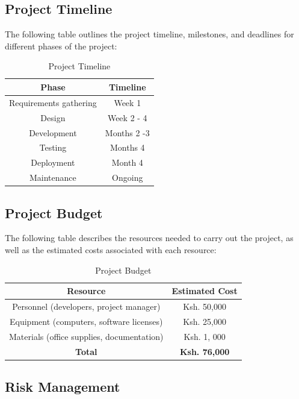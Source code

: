 \documentclass{article}
\begin{document}
\subsection{Project Timeline}

The following table outlines the project timeline, milestones, and deadlines for different phases of the project:

\begin{table}[htbp]
\centering
\caption{Project Timeline}
\begin{tabular}{|c|c|}
\hline
\textbf{Phase} & \textbf{Timeline} \\
\hline
Requirements gathering & Week 1 \\
Design & Week 2 - 4 \\
Development & Months 2 -3 \\
Testing & Months 4 \\
Deployment & Month 4 \\
Maintenance & Ongoing \\
\hline
\end{tabular}%
\label{tab:timeline}%
\end{table}%

\subsection{Project Budget}

The following table describes the resources needed to carry out the project, as well as the estimated costs associated with each resource:

\begin{table}[htbp]
\centering
\caption{Project Budget}
\begin{tabular}{|c|c|}
\hline
\textbf{Resource} & \textbf{Estimated Cost} \\
\hline
Personnel (developers, project manager) & Ksh. 50,000 \\
Equipment (computers, software licenses) & Ksh. 25,000 \\
Materials (office supplies, documentation) & Ksh. 1, 000 \\
\hline
\textbf{Total} & \textbf{Ksh. 76,000} \\
\hline
\end{tabular}%
\label{tab:budget}%
\end{table}%

\subsection{Risk Management}
\end{document}
